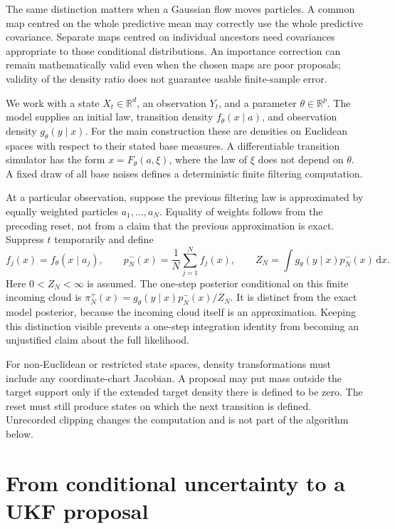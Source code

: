 \documentclass[11pt,a4paper]{article}
\newcommand{\R}{\mathbb R}
\newcommand{\dd}{\mathrm d}
\begin{document}
The same distinction matters when a Gaussian flow moves particles. A common
map centred on the whole predictive mean may correctly use the whole
predictive covariance. Separate maps centred on individual ancestors need
covariances appropriate to those conditional distributions. An importance
correction can remain mathematically valid even when the chosen maps are
poor proposals; validity of the density ratio does not guarantee usable
finite-sample error.

We work with a state \(X_t\in\R^d\), an observation \(Y_t\), and a parameter
\(\theta\in\R^p\). The model supplies an initial law, transition density
\(f_\theta(x\mid a)\), and observation density \(g_\theta(y\mid x)\).
For the main construction these are densities on Euclidean spaces with
respect to their stated base measures. A differentiable transition simulator
has the form \(x=F_\theta(a,\xi)\), where the law of \(\xi\) does not depend
on \(\theta\). A fixed draw of all base noises defines a deterministic
finite filtering computation.

At a particular observation, suppose the previous filtering law is
approximated by equally weighted particles \(a_1,\ldots,a_N\). Equality of
weights follows from the preceding reset, not from a claim that the previous
approximation is exact. Suppress \(t\) temporarily and define
\begin{equation}
\label{eq:finite-target}
 f_j(x)=f_\theta(x\mid a_j),\qquad
 p_N^-(x)=\frac1N\sum_{j=1}^N f_j(x),\qquad
 Z_N=\int g_\theta(y\mid x)p_N^-(x)\,\dd x .
\end{equation}
Here \(0<Z_N<\infty\) is assumed. The one-step posterior conditional on this
finite incoming cloud is
\(\pi_N^+(x)=g_\theta(y\mid x)p_N^-(x)/Z_N\).
It is distinct from the exact model posterior, because the incoming cloud
itself is an approximation. Keeping this distinction visible prevents a
one-step integration identity from becoming an unjustified claim about the
full likelihood.

For non-Euclidean or restricted state spaces, density transformations must
include any coordinate-chart Jacobian. A proposal may put mass outside the
target support only if the extended target density there is defined to be
zero. The reset must still produce states on which the next transition is
defined. Unrecorded clipping changes the computation and is not part of the
algorithm below.

\section{From conditional uncertainty to a UKF proposal}
\end{document}

